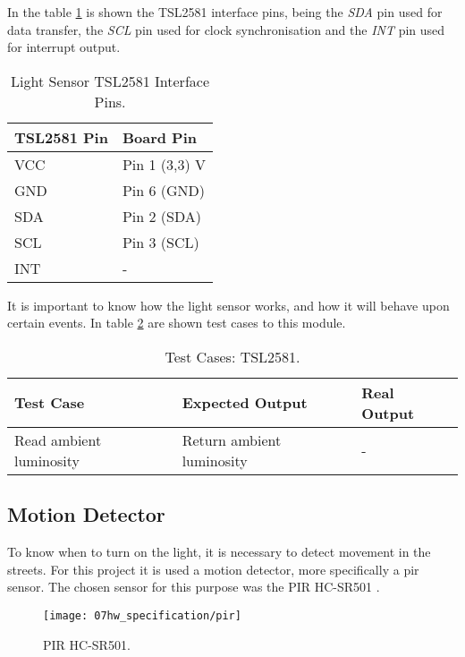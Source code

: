 In the table \ref{table:light_sen} is shown the TSL2581 interface pins, being the \textit{SDA} pin used for data transfer, the \textit{SCL} pin used for clock synchronisation and the \textit{INT} pin used for interrupt output. 

\begin{table}[H]
	\centering
	\begin{tabular}{|m{5cm}|m{6cm}|}
		\hline
		\textbf{TSL2581 Pin} & \textbf{Board Pin}\\\hline\hline
		VCC & Pin 1 (3,3) V\\\hline
		GND & Pin 6 (GND)\\\hline
		SDA & Pin 2 (SDA)\\\hline
		SCL & Pin 3 (SCL)\\\hline
		INT & -\\
		\hline
	\end{tabular}		
	
	\caption{Light Sensor TSL2581 Interface Pins.}
	\label{table:light_sen}
\end{table}

It is important to know how the light sensor works, and how it will behave upon certain events. In table \ref{table:test_light_sen} are shown test cases to this module.

\begin{table}[H]
	\centering
	\resizebox{\columnwidth}{!}
	{
		\begin{tabular}{|m{3cm}|m{5cm}||m{5cm}|}
			\hline
			\textbf{Test Case} & \textbf{Expected Output} & \textbf{Real Output}
			\\\hline\hline
			Read ambient luminosity & Return ambient luminosity  & -
			\\\hline
		\end{tabular}
	}
	\caption{Test Cases: TSL2581.}
	\label{table:test_light_sen}
\end{table}

\clearpage
\subsection{Motion Detector}
To know when to turn on the light, it is necessary to detect movement in the streets. For this project it is used a motion detector, more specifically a \ac{pir} sensor. The chosen sensor for this purpose was the PIR HC-SR501 \cite{pir}.

\begin{figure}[H]
	\centering
	\texttt{[image: 07hw\_specification/pir]}
	\caption{PIR HC-SR501.}
	\label{fig:pir}
\end{figure}

